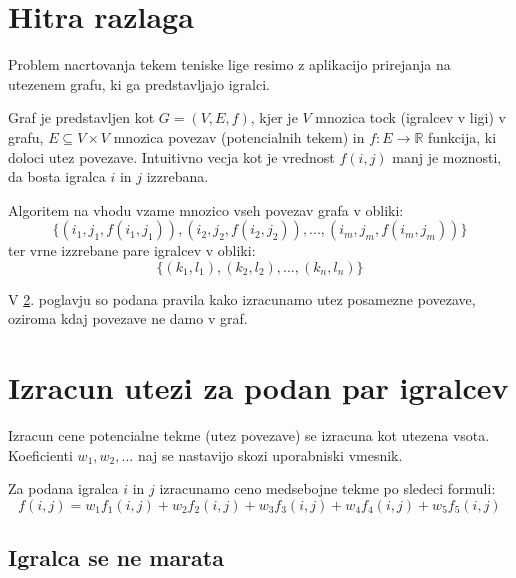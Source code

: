 \documentclass[a4paper, 11pt]{article}
\begin{document}

\section{Hitra razlaga}

Problem nacrtovanja tekem teniske lige resimo z aplikacijo prirejanja na utezenem grafu, ki ga predstavljajo igralci. 

Graf je predstavljen kot $G=(V,E,f)$, kjer je $V$ mnozica tock (igralcev v ligi) v grafu, $E \subseteq V \times V$ mnozica povezav (potencialnih tekem) in $f: E \rightarrow \mathbb{R}$ funkcija, ki doloci utez povezave. Intuitivno vecja kot je vrednost $f(i,j)$ manj je moznosti, da bosta igralca $i$ in $j$ izzrebana.

Algoritem na vhodu vzame mnozico vseh povezav grafa v obliki:
\begin{equation}
	\{(i_1,j_1,f(i_1,j_1)), (i_2,j_2,f(i_2,j_2)), ..., (i_m,j_m,f(i_m,j_m))\}
\end{equation}
ter vrne izzrebane pare igralcev v obliki:
\begin{equation}
	\{(k_1,l_1), (k_2,l_2), ..., (k_n,l_n)\}
\end{equation}

V \ref{sec:calc}. poglavju so podana pravila kako izracunamo utez posamezne povezave, oziroma kdaj povezave ne damo v graf.


\section{Izracun utezi za podan par igralcev}
\label{sec:calc}

Izracun cene potencialne tekme (utez povezave) se izracuna kot utezena vsota. Koeficienti $w_1, w_2, ...$ naj se nastavijo skozi uporabniski vmesnik.

Za podana igralca $i$ in $j$ izracunamo ceno medsebojne tekme po sledeci formuli:
\begin{equation}
	f(i,j) = w_1 f_1(i,j) + w_2 f_2(i,j) + w_3 f_3(i,j) + w_4 f_4(i,j) + w_5 f_5(i,j)
\end{equation}

\subsection{Igralca se ne marata}
\end{document}
